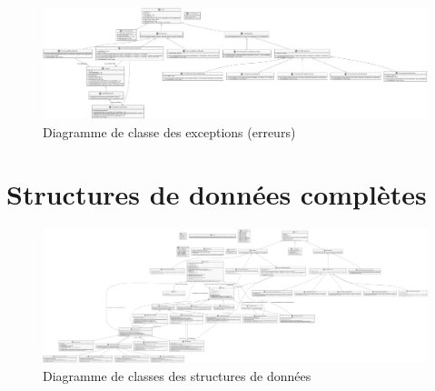 {	\begin{figure}[H]
		\centerline{
			\includegraphics[width=1.0\textwidth,keepaspectratio]{../diagrams-simplified/class/exceptions/lutin-compiler-class-diagram-exceptions-uml.png}
		}	
		\caption{Diagramme de classe des exceptions (erreurs)}
		\label{fig:erreur-structure}
	\end{figure}		
	
	\section{Structures de données complètes}
	\label{sec:full-structure}
	
	\begin{figure}[H]
		\centerline{
			\includegraphics[width=1.15\textwidth,keepaspectratio]{../diagrams/class/lutin-compiler-class-diagram-uml.png}
		}	
		\label{fig:full-structure}
		\caption{Diagramme de classes des structures de données}
	\end{figure}

	\clearpage
	\recalctypearea
}


